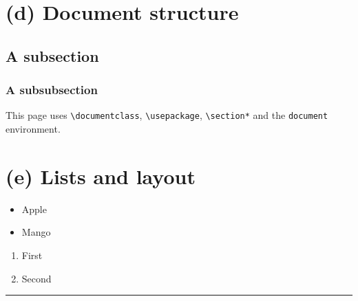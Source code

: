 \documentclass{article}
\begin{document}
			\section*{(d) Document structure}
			\subsection*{A subsection}
			\subsubsection*{A subsubsection}
			This page uses \verb|\documentclass|, \verb|\usepackage|, \verb|\section*| and the \verb|document| environment.
			
				\section*{(e) Lists and layout}
				\begin{itemize} \item Apple \item Mango \end{itemize}
				\begin{enumerate} \item First \item Second \end{enumerate}
				\vspace{5mm}\hrule
				
			
\end{document}

